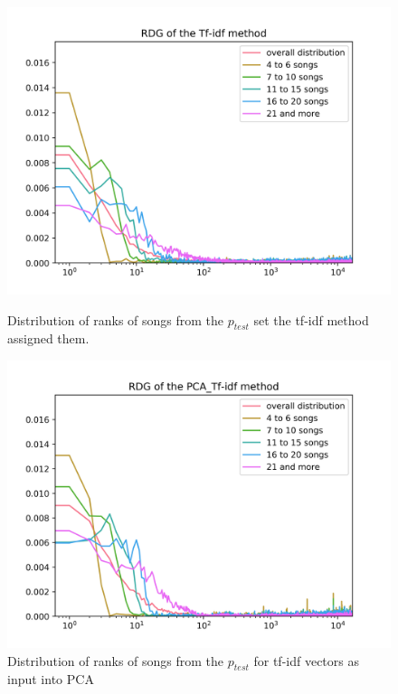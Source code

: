 \begin{figure}[hbt!]
\centering
\begin{minipage}{.5\textwidth}
  \centering
  \includegraphics[width=1\linewidth]{./img/tf_idf_graph.png}
  \caption{Distribution of ranks of songs from the $p_{test}$ set the tf-idf method assigned them.}
  \label{fig:tf_idf_distribution}
\end{minipage}%
\begin{minipage}{.5\textwidth}
  \centering
  \includegraphics[width=1\linewidth]{./img/pca_tf_idf_graph.png}
  \caption{Distribution of ranks of songs from the $p_{test}$ for tf-idf vectors as input into PCA}
  \label{fig:pca_tf_idf_distribution}
\end{minipage}
\end{figure}
